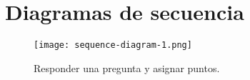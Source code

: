 \documentclass[titlepage,a4paper]{article}
\begin{document}
\section{Diagramas de secuencia}\label{sec:diagramasdesecuencia}



\begin{figure}[H]
\centering
\texttt{[image: sequence-diagram-1.png]}
\caption{\label{fig:seq01}Responder una pregunta y asignar puntos.}
\end{figure}


\end{document}
